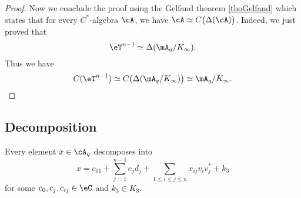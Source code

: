 \begin{proof}
    Now we conclude the proof using the Gelfand theorem \ref{thoGelfand} which states that for every $C^*$-algebra $\cA$, we have $\cA\simeq C\big( \Delta(\cA) \big)$. Indeed, we just proved that 
    \begin{equation}
        \eT^{n-1}\simeq\Delta(\mA_q/K_{\infty}).
    \end{equation}
    Thus we have
    \begin{equation}
        C(\eT^{n-1})\simeq C\big( \Delta(\mA_q/K_{\infty}) \big)\simeq\mA_q/K_{\infty}.
    \end{equation}
\end{proof}

\subsection{Decomposition}

\begin{proposition}
    Every element $x\in\cA_q$ decomposes into
    \begin{equation}
        x=c_01+\sum_{j=1}^{n-1}c_jd_j+\sum_{1\leq i\leq j\leq n}x_{ij}v_iv_j^*+k_3
    \end{equation}
    for some $c_0,c_j,c_{ij}\in \eC$ and $k_3\in K_3$.
\end{proposition}

